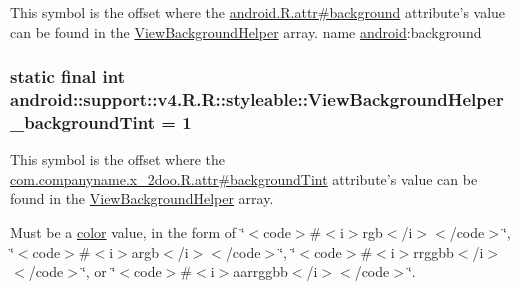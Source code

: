 This symbol is the offset where the \hyperlink{}{android.R.attr\#background} attribute's value can be found in the \hyperlink{classandroid_1_1support_1_1v4_1_1_r_1_1styleable_d2471e02511d7025f7168272065a760a}{ViewBackgroundHelper} array.  name \hyperlink{namespaceandroid}{android}:background \hypertarget{classandroid_1_1support_1_1v4_1_1_r_1_1styleable_2909631ff949ac1d62e73fab3d3f3657}{
\subsubsection[{ViewBackgroundHelper\_\-backgroundTint}]{\setlength{\rightskip}{0pt plus 5cm}static final int android::support::v4.R.R::styleable::ViewBackgroundHelper\_\-backgroundTint = 1}}
\label{classandroid_1_1support_1_1v4_1_1_r_1_1styleable_2909631ff949ac1d62e73fab3d3f3657}


This symbol is the offset where the \hyperlink{classcom_1_1companyname_1_1x__2doo_1_1_r_1_1attr_8893d15496aa78adf7f63c789d335c3b}{com.companyname.x\_\-2doo.R.attr\#backgroundTint} attribute's value can be found in the \hyperlink{classandroid_1_1support_1_1v4_1_1_r_1_1styleable_d2471e02511d7025f7168272065a760a}{ViewBackgroundHelper} array.

Must be a \hyperlink{classandroid_1_1support_1_1v4_1_1_r_1_1color}{color} value, in the form of \char`\"{}$<$code$>$\#$<$i$>$rgb$<$/i$>$$<$/code$>$\char`\"{}, \char`\"{}$<$code$>$\#$<$i$>$argb$<$/i$>$$<$/code$>$\char`\"{}, \char`\"{}$<$code$>$\#$<$i$>$rrggbb$<$/i$>$$<$/code$>$\char`\"{}, or \char`\"{}$<$code$>$\#$<$i$>$aarrggbb$<$/i$>$$<$/code$>$\char`\"{}. 

